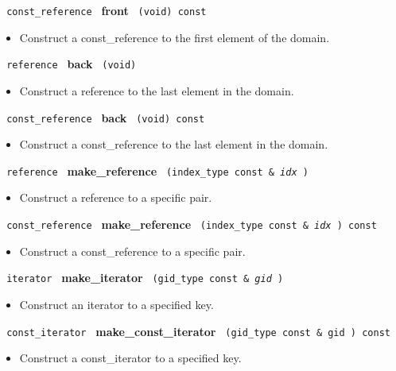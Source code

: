 \noindent
\texttt{%
const\_reference
}
\textbf{front}%
\texttt{%
(void) const
}

\begin{itemize}
\item
Construct a const\_reference to the first element of the domain.
\end{itemize}
 
\noindent
\texttt{%
reference
}
\textbf{back}%
\texttt{%
(void)
}

\begin{itemize}
\item
Construct a reference to the last element in the domain.
\end{itemize}
 
\noindent
\texttt{%
const\_reference
}
\textbf{back}%
\texttt{%
(void) const
}

\begin{itemize}
\item
Construct a const\_reference to the last element in the domain.
\end{itemize}
 
\noindent
\texttt{%
reference
}
\textbf{make\_reference}%
\texttt{%
(index\_type const \&
\textit{idx}%
)
}

\begin{itemize}
\item
Construct a reference to a specific pair.
\end{itemize}
 
\noindent
\texttt{%
const\_reference
}
\textbf{make\_reference}%
\texttt{%
(index\_type const \&
\textit{idx}%
) const
}

\begin{itemize}
\item
Construct a const\_reference to a specific pair.
\end{itemize}
 
\noindent
\texttt{%
iterator
}
\textbf{make\_iterator}%
\texttt{%
(gid\_type const \&
\textit{gid}%
)
}

\begin{itemize}
\item
Construct an iterator to a specified key.
\end{itemize}
 
\noindent
\texttt{%
const\_iterator 
}
\textbf{make\_const\_iterator}%
\texttt{%
(gid\_type const \&
gid
) const
}

\begin{itemize}
\item
Construct a const\_iterator to a specified key.
\end{itemize}
 
